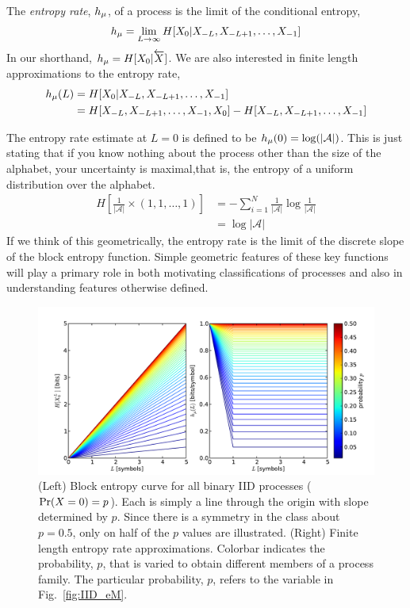 \begin{Def}
The \emph{entropy rate}, $h_\mu$, of a process is the limit of the conditional entropy,
\begin{align*}
h_\mu = \lim_{L \to \infty}{H[{X}_0 | {X}_{-L}, {X}_{-L+1}, \ldots, {X}_{-1}]}
\end{align*}
In our shorthand, $h_\mu = H[{X}_0 | \smash{\overleftarrow {{X}}}]$.
We are also interested in finite length approximations to the entropy rate,
\begin{align*}
h_\mu(L) &= H[{X}_0 | {X}_{-L}, {X}_{-L+1}, \ldots, {X}_{-1}]\\
&= H[{X}_{-L}, {X}_{-L+1}, \ldots, {X}_{-1}, {X}_{0}] - H[{X}_{-L}, {X}_{-L+1}, \ldots, {X}_{-1}]
\end{align*}
\end{Def}
The entropy rate estimate at $L=0$ is defined to be $h_\mu(0)=\log(|\mathcal{A}|)$. This is just stating that if you know nothing about the process other than the size of the alphabet, your uncertainty is maximal,that is, the entropy of a uniform distribution over the alphabet.
\begin{align*}
H[\frac{1}{|\mathcal{A}|} \times (1,1,\ldots,1)] &= -\sum_{i=1}^N{\frac{1}{|\mathcal{A}|} \log{\frac{1}{|\mathcal{A}|}}}\\
&=\log{|\mathcal{A}|}
\end{align*}
If we think of this geometrically, the entropy rate is the limit of the discrete slope of the block entropy function. Simple geometric features of these key functions will play a primary role in both motivating classifications of processes and also in understanding features otherwise defined.
\begin{figure}[h!]
\centering
\includegraphics[scale = 0.6]{../chapter1/figures/scripts/BE_IID_all}
\caption{(Left) Block entropy curve for all binary IID processes ($\Pr({X}=0) = p$). Each is simply a line through the origin with slope determined by $p$. Since there is a symmetry in the class about $p=0.5$, only on half of the $p$ values are illustrated. (Right) Finite length entropy rate approximations. Colorbar indicates the probability, $p$, that is varied to obtain different members of a process family. The particular probability, $p$, refers to the variable in Fig.~\ref{fig:IID_eM}.}
\label{fig:BE_IID_all}
\end{figure}
